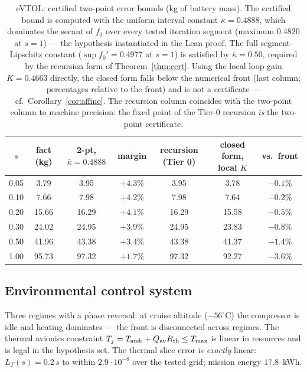 \documentclass[11pt]{article}
\numberwithin{equation}{section}
\begin{document}
\begin{table}[h]
\centering
\begin{tabular}{ccccccc}
\toprule
$s$ & fact (kg) & 2-pt, $\bar\kappa=0.4888$ & margin & recursion (Tier 0) & closed form, local $K$ & vs.\ front \\
\midrule
0.05 & 3.79  & 3.95  & $+4.3\%$ & 3.95  & 3.78  & $-0.1\%$ \\
0.10 & 7.66  & 7.98  & $+4.2\%$ & 7.98  & 7.64  & $-0.2\%$ \\
0.20 & 15.66 & 16.29 & $+4.1\%$ & 16.29 & 15.58 & $-0.5\%$ \\
0.30 & 24.02 & 24.95 & $+3.9\%$ & 24.95 & 23.83 & $-0.8\%$ \\
0.50 & 41.96 & 43.38 & $+3.4\%$ & 43.38 & 41.37 & $-1.4\%$ \\
1.00 & 95.73 & 97.32 & $+1.7\%$ & 97.32 & 92.27 & $-3.6\%$ \\
\bottomrule
\end{tabular}
\caption{eVTOL: certified two-point error bounds (kg of battery mass). The
certified bound is computed with the uniform interval constant
$\bar\kappa=0.4888$, which dominates the secant of $f_0$ over every tested
iteration segment (maximum $0.4820$ at $s=1$) --- the hypothesis instantiated
in the Lean proof. The full segment-Lipschitz constant
($\sup f_0'=0.4977$ at $s=1$) is satisfied by $\bar\kappa=0.50$, required by
the recursion form of Theorem~\ref{thm:cert}. Using the local loop gain
$K=0.4663$ directly, the closed form falls below the numerical front (last
column; percentages relative to the front) and is not a certificate ---
cf.\ Corollary~\ref{cor:affine}. The recursion column coincides with the
two-point column to machine precision: the fixed point of the Tier-0
recursion \emph{is} the two-point certificate.}
\label{tab:evtol}
\end{table}

\subsection{Environmental control system}
Three regimes with a phase reversal: at cruise altitude ($-56^\circ$C) the
compressor is idle and heating dominates --- the front is disconnected across
regimes. The thermal avionics constraint
$T_j=T_{\rm amb}+Q_{\rm av}R_{\rm th}\le T_{\rm max}$ is linear in resources
and is legal in the hypothesis set. The thermal slice error is \emph{exactly}
linear: $L_T(s)=0.2\,s$ to within $2.9\cdot10^{-8}$ over the tested grid;
mission energy $17.8$~kWh.
\end{document}
